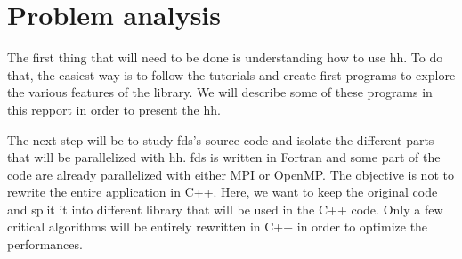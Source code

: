
\clearpage
\section{Problem analysis}

The first thing that will need to be done is understanding how to use \gls{hh}.
To do that, the easiest way is to follow the tutorials and create first programs
to explore the various features of the library. We will describe some of these
programs in this repport in order to present the \gls{hh}.

The next step will be to study \gls{fds}'s source code and isolate the
different parts that will be parallelized with \gls{hh}. \gls{fds} is written in
Fortran and some part of the code are already parallelized with either MPI or
OpenMP. The objective is not to rewrite the entire application in C++. Here, we
want to keep the original code and split it into different library that will be
used in the C++ code. Only a few critical algorithms will be entirely rewritten
in C++ in order to optimize the performances.
